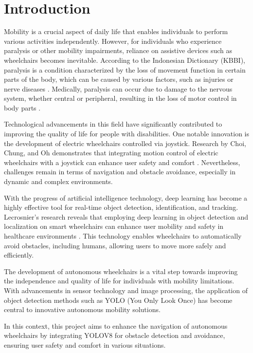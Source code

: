     \section{Introduction}
    \label{sec:introduction}


    Mobility is a crucial aspect of daily life that enables individuals to perform various activities independently. However, for individuals who experience paralysis or other mobility impairments, reliance on assistive devices such as wheelchairs becomes inevitable. According to the Indonesian Dictionary (KBBI), paralysis is a condition characterized by the loss of movement function in certain parts of the body, which can be caused by various factors, such as injuries or nerve diseases \cite{Daring_2016}. Medically, paralysis can occur due to damage to the nervous system, whether central or peripheral, resulting in the loss of motor control in body parts \cite{Pansawira_2022}.

    Technological advancements in this field have significantly contributed to improving the quality of life for people with disabilities. One notable innovation is the development of electric wheelchairs controlled via joystick. Research by Choi, Chung, and Oh demonstrates that integrating motion control of electric wheelchairs with a joystick can enhance user safety and comfort \cite{choi2019motion}. Nevertheless, challenges remain in terms of navigation and obstacle avoidance, especially in dynamic and complex environments.

    With the progress of artificial intelligence technology, deep learning has become a highly effective tool for real-time object detection, identification, and tracking. Lecrosnier's research reveals that employing deep learning in object detection and localization on smart wheelchairs can enhance user mobility and safety in healthcare environments \cite{lecrosnier2021deep}. This technology enables wheelchairs to automatically avoid obstacles, including humans, allowing users to move more safely and efficiently.

    The development of autonomous wheelchairs is a vital step towards improving the independence and quality of life for individuals with mobility limitations. With advancements in sensor technology and image processing, the application of object detection methods such as YOLO (You Only Look Once) has become central to innovative autonomous mobility solutions.

    In this context, this project aims to enhance the navigation of autonomous wheelchairs by integrating YOLOV8 for obstacle detection and avoidance, ensuring user safety and comfort in various situations.